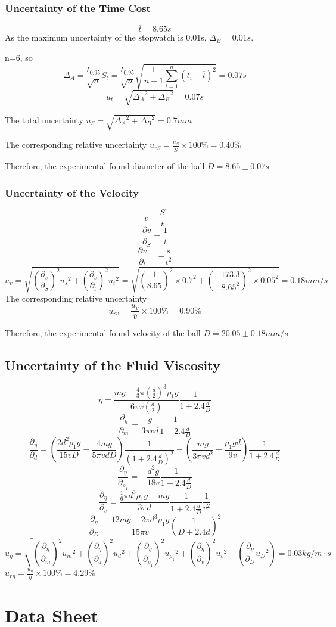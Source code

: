\documentclass[12pt,a4paper]{article}
\begin{document}
\subsubsection{Uncertainty of the Time Cost}
$$\overline{t}=8.65s$$
As the maximum uncertainty of the stopwatch is 0.01s, $\Delta_B=0.01s$. \par 
n=6, so $$\Delta_A=\frac{t_{0.95}}{\sqrt{n}}S_t=\frac{t_{0.95}}{\sqrt{n}}\sqrt{\frac{1}{n-1}\sum^n_{i=1}(t_i-\overline{t})^2}=0.07s$$
$$u_t=\sqrt{{\Delta_A}^2+{\Delta_B}^2}=0.07s$$ \par
The total uncertainty $u_S=\sqrt{{\Delta_A}^2+{\Delta_B}^2}=0.7mm$\par 
The corresponding relative uncertainty $u_{rS}=\frac{u_S}{\overline{S}}\times 100\%=0.40\%$ \par 
Therefore, the experimental found diameter of the ball $D=8.65 \pm 0.07s$

\subsubsection{Uncertainty of the Velocity}
$$v=\frac{S}{t}$$
$$\frac{\partial v}{\partial_S}=\frac{1}{t}$$
$$\frac{\partial v}{\partial_t}=-\frac{s}{t^2}$$
$$u_v=\sqrt{(\frac{\partial_v}{\partial_S})^2{u_s}^2+(\frac{\partial_v}{\partial_t})^2{u_t}^2}=\sqrt{(\frac{1}{8.65})^2\times 0.7^2+(-\frac{173.3}{8.65^2})^2\times 0.05^2}=0.18mm/s$$
The corresponding relative uncertainty $$u_{rv}=\frac{u_v}{\overline{v}}\times 100\%=0.90\%$$\par
Therefore, the experimental found velocity of the ball $D=20.05 \pm 0.18mm/s$

\subsection{Uncertainty of the Fluid Viscosity}
$$\eta=\frac{mg-\frac{4}{3}\pi(\frac{d}{2})^3\rho_1g}{6\pi v (\frac{d}{2})}\frac{1}{1+2.4\frac{d}{D}}$$
$$\frac{\partial_\eta}{\partial_m}=\frac{g}{3\pi vd}\frac{1}{1+2.4\frac{d}{D}}$$
$$\frac{\partial_\eta}{\partial_d}=(\frac{2d^2\rho_1g}{15vD}-\frac{4mg}{5\pi vdD})\frac{1}{(1+2.4\frac{d}{D})^2}-(\frac{mg}{3\pi vd^2}+\frac{\rho_1gd}{9v})\frac{1}{1+2.4\frac{d}{D}}$$
$$\frac{\partial_\eta}{\partial_{\rho_1}}=-\frac{d^2g}{18v}\frac{1}{1+2.4\frac{d}{D}}$$
$$\frac{\partial_\eta}{\partial_v}=\frac{\frac{1}{6}\pi d^3\rho_1g-mg}{3\pi d}\frac{1}{1+2.4\frac{d}{D}}\frac{1}{v^2}$$
$$\frac{\partial_\eta}{\partial_D}=\frac{12mg-2\pi d^3\rho_1g}{15\pi v}(\frac{1}{D+2.4d})^2$$
$$u_\eta=\sqrt{(\frac{\partial_\eta}{\partial_m})^2{u_m}^2+(\frac{\partial_\eta}{\partial_d})^2{u_d}^2+(\frac{\partial_\eta}{\partial_{\rho_1}})^2{u_{\rho_1}}^2+(\frac{\partial_\eta}{\partial_v})^2{u_v}^2}+(\frac{\partial_\eta}{\partial_D}{u_D}^2)=0.03kg/m\cdot s$$
$u_{r\eta}=\frac{u_\eta}{\eta}\times 100\%=4.29\%$

\section{Data Sheet}
\end{document}
